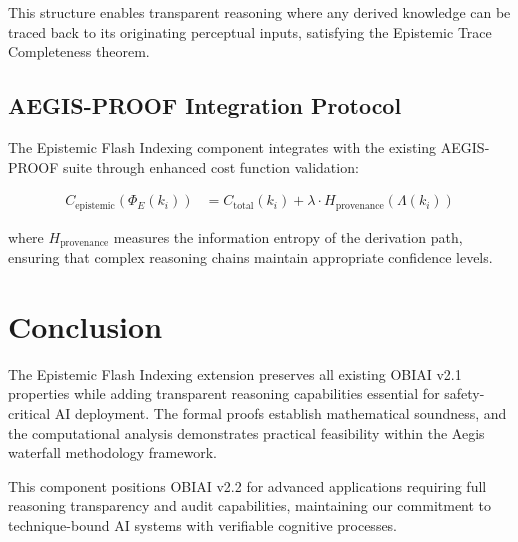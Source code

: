 \documentclass[12pt]{article}
\begin{document}
This structure enables transparent reasoning where any derived knowledge can be traced back to its originating perceptual inputs, satisfying the Epistemic Trace Completeness theorem.

\subsection{AEGIS-PROOF Integration Protocol}

The Epistemic Flash Indexing component integrates with the existing AEGIS-PROOF suite through enhanced cost function validation:

\begin{align}
C_{\text{epistemic}}(\Phi_E(k_i)) &= C_{\text{total}}(k_i) + \lambda \cdot H_{\text{provenance}}(\Lambda(k_i))
\end{align}

where $H_{\text{provenance}}$ measures the information entropy of the derivation path, ensuring that complex reasoning chains maintain appropriate confidence levels.

\section{Conclusion}

The Epistemic Flash Indexing extension preserves all existing OBIAI v2.1 properties while adding transparent reasoning capabilities essential for safety-critical AI deployment. The formal proofs establish mathematical soundness, and the computational analysis demonstrates practical feasibility within the Aegis waterfall methodology framework.

This component positions OBIAI v2.2 for advanced applications requiring full reasoning transparency and audit capabilities, maintaining our commitment to technique-bound AI systems with verifiable cognitive processes.
\end{document}
